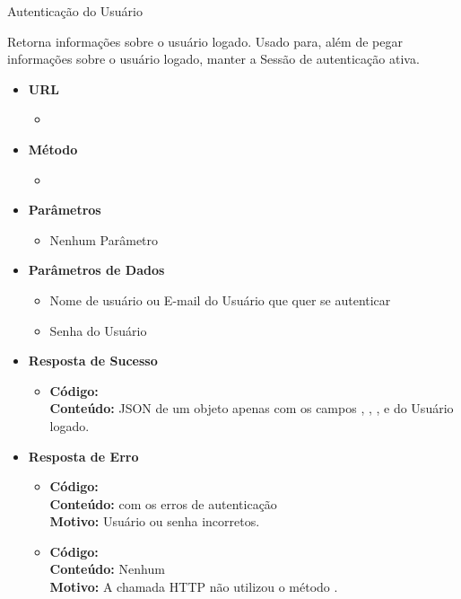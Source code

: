 \begin{caixa}{Autenticação do Usuário}{}

Retorna informações sobre o usuário logado. Usado para, além de pegar informações sobre o usuário logado, manter a Sessão de autenticação ativa.

\begin{itemize}
\item \textbf{URL}
	\begin{itemize}
		\item {}
	\end{itemize}

\item \textbf{Método}
	\begin{itemize}
		\item {}
	\end{itemize}

\item \textbf{Parâmetros}
	\begin{itemize}
    	\item Nenhum Parâmetro
	\end{itemize}

\item \textbf{Parâmetros de Dados}
	\begin{itemize}
        \item {} Nome de usuário ou E-mail do Usuário que quer se autenticar
        \item {} Senha do Usuário
	\end{itemize}

\item \textbf{Resposta de Sucesso}
	\begin{itemize}
		\item \textbf{Código:}  \\ \textbf{Conteúdo:} JSON de um objeto  apenas com os campos , , ,  e  do Usuário logado.
	\end{itemize}

\item \textbf{Resposta de Erro}
	\begin{itemize}
		\item \textbf{Código:}  \\ \textbf{Conteúdo:}  com os erros de autenticação \\ \textbf{Motivo:} Usuário ou senha incorretos.
        \item \textbf{Código:}  \\ \textbf{Conteúdo:} Nenhum \\ \textbf{Motivo:} A chamada HTTP não utilizou o método .
	\end{itemize}

\end{itemize}
\end{caixa}

